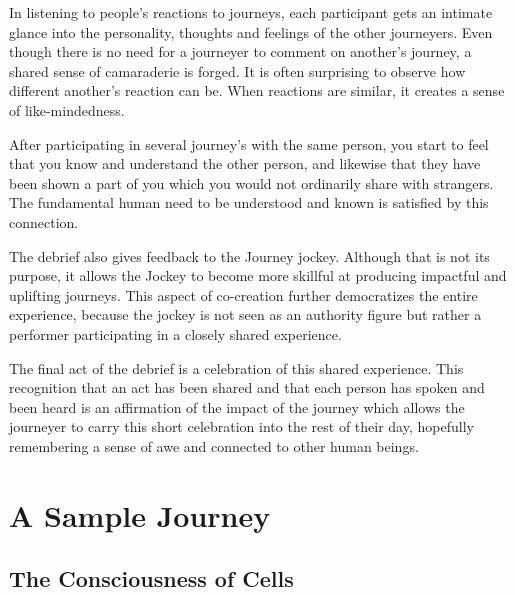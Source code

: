 \documentclass[12pt]{book}
\begin{document}
In listening to people’s reactions to journeys, each participant gets an intimate glance into the personality, thoughts and feelings of the other journeyers. Even though there is no need for a journeyer to comment on another’s journey, a shared sense of camaraderie is forged. It is often surprising to observe how different another’s reaction can be. When reactions are similar, it creates a sense of like-mindedness.
					
After participating in several journey’s with the same person, you start to feel that you know and understand the other person, and likewise that they have been shown a part of you which you would not ordinarily share with strangers. The fundamental human need to be understood and known is satisfied by this connection.
					
The debrief also gives feedback to the Journey jockey. Although that is not its purpose, it allows  the Jockey to become more skillful at producing impactful and uplifting journeys. This aspect of co-creation further democratizes the entire experience, because the jockey is not seen as an authority figure but rather a performer participating in a closely shared experience.
				
					
The final act of the debrief is a celebration of this shared experience. This recognition that an act has been shared and that each person has spoken and been heard is an affirmation of the impact of the journey which allows the journeyer to carry this short celebration into the rest of their day, hopefully remembering a sense of awe and connected to other human beings.


\chapter{A Sample Journey}


\section{The Consciousness of Cells}
\end{document}
